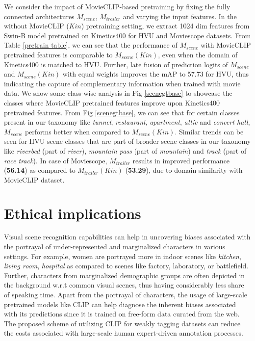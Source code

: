 We consider the impact of MovieCLIP-based pretraining by fixing the fully connected architectures $M_{scene}$, $M_{trailer}$ and varying the input features. In the without MovieCLIP ($Kin$) pretraining setting, we extract 1024 dim features from Swin-B model pretrained on Kinetics400 for HVU and Moviescope datasets. 
From Table \ref{pretrain table}, we can see that the performance of $M_{scene}$ with MovieCLIP pretrained features is comparable to $M_{scene}(Kin)$, even when the domain of Kinetics400 \cite{kinetics400} is matched to HVU. Further, late fusion of prediction logits of $M_{scene}$ and  $M_{scene}(Kin)$ with equal weights improves the mAP to 57.73 for HVU, thus indicating the capture of complementary information when trained with movie data.
We show some class-wise analysis in Fig \ref{scenegtbase} to showcase the classes where MovieCLIP pretrained features improve upon Kinetics400 pretrained features. From Fig \ref{scenegtbase}, we can see that for certain classes present in our taxonomy like \textit{tunnel}, \textit{restaurant}, \textit{apartment}, \textit{attic} and \textit{concert hall}, $M_{scene}$ performs better when compared to $M_{scene}(Kin)$. Similar trends can be seen for HVU scene classes that are part of broader scene classes in our taxonomy like \textit{riverbed} (part of \textit{river}), \textit{mountain pass} (part of \textit{mountain}) and \textit{track} (part of \textit{race track}).
In case of Moviescope, $M_{trailer}$ 
results in improved performance (\textbf{56.14}) as compared to $M_{trailer}(Kin)$ (\textbf{53.29}), due to domain similarity with MovieCLIP dataset. 
\section{Ethical implications}
Visual scene recognition capabilities can help in uncovering biases associated with the portrayal of under-represented and marginalized characters in various settings. For example, women are portrayed more in indoor scenes like \textit{kitchen}, \textit{living room}, \textit{hospital} as compared to scenes like factory, laboratory, or battlefield. Further, characters from marginalized demographic groups are often depicted in the background w.r.t common visual scenes, thus having considerably less share of speaking time. Apart from the portrayal of characters, the usage of large-scale pretrained models like CLIP \cite{CLIP} can help diagnose the inherent biases associated with its predictions since it is trained on free-form data curated from the web. The proposed scheme of utilizing CLIP for weakly tagging datasets can reduce the costs associated with large-scale human expert-driven annotation processes.
